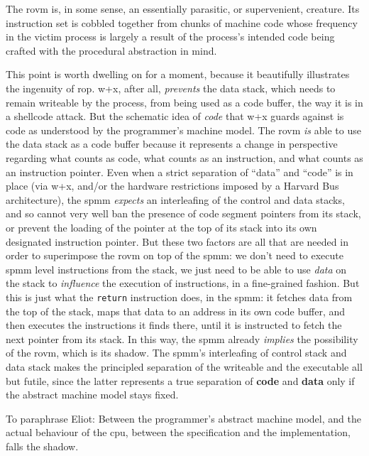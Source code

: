\documentclass[12pt,glossary]{dalthesis}
\begin{document}
The \gls{rovm} is, in some sense, an essentially parasitic, or supervenient,
creature. Its instruction set is cobbled together from chunks of machine code
whose frequency in the victim process is largely a result of the process's
intended code being crafted with the procedural abstraction in mind.

This point is worth dwelling on for a moment, because it beautifully illustrates
the ingenuity of \gls{rop}. \gls{w+x}, after all, \emph{prevents} the data stack, which
needs to remain writeable by the process, from being used as a code buffer, the
way it is in a shellcode attack. But the schematic idea of \emph{code} that \gls{w+x} 
guards against is code as understood by the programmer's machine model. The
\gls{rovm} \emph{is} able to use the data stack as a code buffer because it represents a
change in perspective regarding what counts as code, what counts as an
instruction, and what counts as an instruction pointer. Even when a strict
separation of ``data'' and ``code'' is in place (via \gls{w+x}, and/or the
hardware restrictions imposed by a Harvard Bus architecture), the \gls{spmm} \emph{expects}
an interleafing of the control and data stacks, and so cannot very well ban the
presence of code segment pointers from its stack, or prevent the loading of the
pointer at the top of its stack into its own designated instruction pointer. But
these two factors are all that are needed in order to superimpose the \gls{rovm} on
top of the \gls{spmm}: we don't need to execute \gls{spmm} level instructions from the stack,
we just need to be able to use \emph{data} on the stack to \emph{influence} the execution
of instructions, in a fine-grained fashion. But this is just what the \texttt{return}
instruction does, in the \gls{spmm}: it fetches data from the top of the stack, maps
that data to an address in its own code buffer, and then executes the
instructions it finds there, until it is instructed to fetch the next pointer
from its stack. In this way, the \gls{spmm} already \emph{implies} the possibility of the
\gls{rovm}, which is its shadow. The \gls{spmm}'s interleafing of control stack and data
stack makes the principled separation of the writeable and the executable all
but futile, since the latter represents a true separation of \textbf{code} and \textbf{data}
only if the abstract machine model stays fixed.

To paraphrase Eliot: Between the programmer's abstract machine model, and the actual behaviour of the
\gls{cpu}, between the specification and the implementation, falls the shadow.
\end{document}
